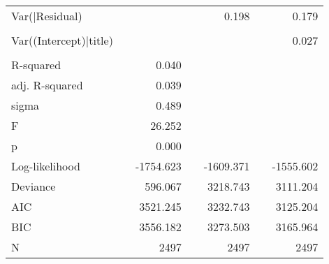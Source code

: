 \begin{tabular}{lcD{.}{.}{7}cD{.}{.}{7}cD{.}{.}{7}}
Var(|Residual)                                          &  &              &&   0.198      &&   0.179     \\
                                                        &  &              &&              &&             \\
Var((Intercept)|title)                                  &  &              &&              &&   0.027     \\
                                                        &  &              &&              &&             \\
\midrule
R-squared                                               &  &      0.040   &&              &&             \\
adj. R-squared                                          &  &      0.039   &&              &&             \\
sigma                                                   &  &      0.489   &&              &&             \\
F                                                       &  &     26.252   &&              &&             \\
p                                                       &  &      0.000   &&              &&             \\
Log-likelihood                                          &  &  -1754.623   &&  -1609.371   &&  -1555.602  \\
Deviance                                                &  &    596.067   &&   3218.743   &&   3111.204  \\
AIC                                                     &  &   3521.245   &&   3232.743   &&   3125.204  \\
BIC                                                     &  &   3556.182   &&   3273.503   &&   3165.964  \\
N                                                       &  &   2497       &&   2497       &&   2497      \\
\bottomrule
\end{tabular}
